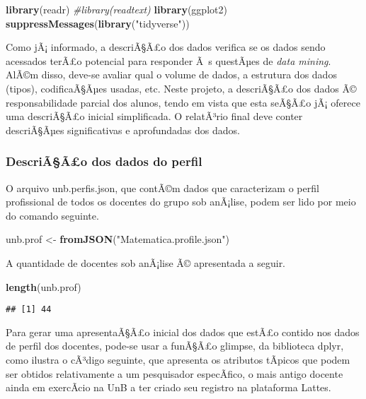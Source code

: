 \documentclass[]{article}
\newenvironment{Shaded}{\begin{snugshade}}{\end{snugshade}}
\newcommand{\KeywordTok}[1]{\textcolor[rgb]{0.13,0.29,0.53}{\textbf{#1}}}
\newcommand{\StringTok}[1]{\textcolor[rgb]{0.31,0.60,0.02}{#1}}
\newcommand{\CommentTok}[1]{\textcolor[rgb]{0.56,0.35,0.01}{\textit{#1}}}
\newcommand{\NormalTok}[1]{#1}
\begin{document}
\begin{Shaded}
\begin{Highlighting}[]
\KeywordTok{library}\NormalTok{(readr)}
\CommentTok{#library(readtext)}
\KeywordTok{library}\NormalTok{(ggplot2)}
\KeywordTok{suppressMessages}\NormalTok{(}\KeywordTok{library}\NormalTok{(}\StringTok{"tidyverse"}\NormalTok{))}
\end{Highlighting}
\end{Shaded}

Como jÃ¡ informado, a descriÃ§Ã£o dos dados verifica se os dados sendo
acessados terÃ£o potencial para responder Ã~s questÃµes de \emph{data
mining}. AlÃ©m disso, deve-se avaliar qual o volume de dados, a
estrutura dos dados (tipos), codificaÃ§Ãµes usadas, etc. Neste projeto,
a descriÃ§Ã£o dos dados Ã© responsabilidade parcial dos alunos, tendo em
vista que esta seÃ§Ã£o jÃ¡ oferece uma descriÃ§Ã£o inicial simplificada.
O relatÃ³rio final deve conter descriÃ§Ãµes significativas e
aprofundadas dos dados.

\subsubsection{DescriÃ§Ã£o dos dados do
perfil}\label{descriaao-dos-dados-do-perfil}

O arquivo unb.perfis.json, que contÃ©m dados que caracterizam o perfil
profissional de todos os docentes do grupo sob anÃ¡lise, podem ser lido
por meio do comando seguinte.

\begin{Shaded}
\begin{Highlighting}[]
\NormalTok{unb.prof <-}\StringTok{ }\KeywordTok{fromJSON}\NormalTok{(}\StringTok{"Matematica.profile.json"}\NormalTok{)}
\end{Highlighting}
\end{Shaded}

A quantidade de docentes sob anÃ¡lise Ã© apresentada a seguir.

\begin{Shaded}
\begin{Highlighting}[]
\KeywordTok{length}\NormalTok{(unb.prof)}
\end{Highlighting}
\end{Shaded}

\begin{verbatim}
## [1] 44
\end{verbatim}

Para gerar uma apresentaÃ§Ã£o inicial dos dados que estÃ£o contido nos
dados de perfil dos docentes, pode-se usar a funÃ§Ã£o glimpse, da
biblioteca dplyr, como ilustra o cÃ³digo seguinte, que apresenta os
atributos tÃ­picos que podem ser obtidos relativamente a um pesquisador
especÃ­fico, o mais antigo docente ainda em exercÃ­cio na UnB a ter
criado seu registro na plataforma Lattes.
\end{document}
